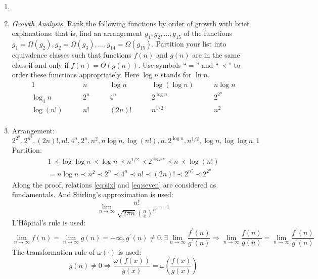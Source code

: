 \documentclass[12pt,a4paper]{article}
\makeatletter
\newtheorem*{solution}{Solution}
\theoremstyle{definition}
\renewenvironment{solution}[1][Solution] {\par\pushQED{\qed}\normalfont\topsep6\p@\@plus6\p@\relax\trivlist\item[\hskip\labelsep\bfseries#1\@addpunct{.}]\ignorespaces}{\popQED\endtrivlist\@endpefalse} \makeatother
\providecommand{\limn}{\lim_{n\rightarrow \infty}}
\makeatother
\begin{document}
\begin{enumerate}
\begin{solution}
\end{solution}
\newpage
\item \textit{Growth Analysis.} Rank the following functions by order of growth with brief explanations: that is, find an arrangement $g_1, g_2, \ldots , g_{15}$ of the functions $g_1 = \Omega(g_2), g_2 = \Omega(g_3), \ldots, g_{14} = \Omega(g_{15})$.  Partition your list into equivalence classes such that functions $f(n)$ and $g(n)$ are in the same class if and only if $f(n) = \Theta(g(n))$. Use symbols ``$=$'' and ``$\prec$'' to order these functions appropriately. Here $\log n$ stands for $\ln n$.
$$
\begin{array}{ccccc}
	1 \quad & \quad n \quad & \quad \log n \quad & \quad \log (\log n) \quad & \quad n \log n \\
	\log_4 n \quad & \quad 2^n \quad & \quad 4^n \quad & \quad 2^{\log n} \quad & \quad 2^{2^n} \\
	\log (n!) \quad & \quad n! \quad & \quad (2n)! \quad & \quad  n^{1/2} \quad & \quad n^2 \\
\end{array}
$$
\begin{solution}
	Arrangement:
	\begin{equation*}
		2^{2^n},2^{n^2},(2n)!,n!,4^{n},2^n,n^2,n\log n,\log (n!),n,2^{\log n},n^{1/2},\log n,\log \log n,1
	\end{equation*}
	Partition:
	\begin{equation*}
		\begin{aligned}
			1\prec \log\log n\prec \log n\prec n^{1/2}\prec 2^{\log n}\prec n\prec \log (n!)\\= n\log n
			\prec n^2 \prec 2^n \prec 4^{n}\prec n!\prec (2n)!\prec 2^{n^2}\prec 2^{2^n}
		\end{aligned}
	\end{equation*}
	Along the proof, relations \eqref{eq:six} and \eqref{eq:seven} are considered as fundamentals. And Stirling's approximation is used:
	\begin{equation*}
		\limn \frac{n!}{\sqrt{2\pi n}\left(\frac{n}{e}\right)^n} = 1
	\end{equation*}
	L'H\^{o}pital's rule is used: 
	\begin{equation*}
		\limn f(n) = \limn g(n)=+\infty,g^\prime (n)\neq 0,\exists \limn \frac{f^\prime (n)}{g^\prime (n)}\Rightarrow\limn \frac{f(n)}{g(n)} = \limn \frac{f^\prime (n)}{g^\prime (n)}
	\end{equation*}
	The transformation rule of $\omega(\cdot)$ is used:
	\begin{equation*}
		g(n)\neq 0 \Rightarrow \frac{\omega(f(x))}{g(x)} = \omega \left(\frac{f(x)}{g(x)}\right)
	\end{equation*}


\end{solution}
\end{enumerate}
\end{document}
